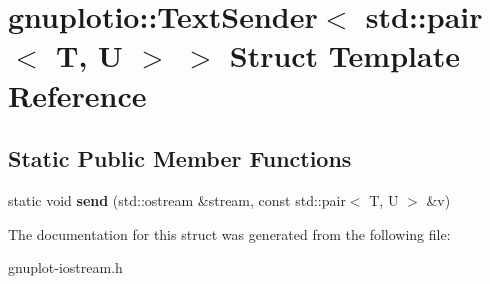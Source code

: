 \hypertarget{structgnuplotio_1_1TextSender_3_01std_1_1pair_3_01T_00_01U_01_4_01_4}{}\section{gnuplotio\+:\+:Text\+Sender$<$ std\+:\+:pair$<$ T, U $>$ $>$ Struct Template Reference}
\label{structgnuplotio_1_1TextSender_3_01std_1_1pair_3_01T_00_01U_01_4_01_4}
\subsection*{Static Public Member Functions}
\begin{DoxyCompactItemize}
\item 
\mbox{\label{structgnuplotio_1_1TextSender_3_01std_1_1pair_3_01T_00_01U_01_4_01_4_ae1f3a6ffd8a60bb73d787578327154d1}} 
static void {\bfseries send} (std\+::ostream \&stream, const std\+::pair$<$ T, U $>$ \&v)
\end{DoxyCompactItemize}


The documentation for this struct was generated from the following file\+:\begin{DoxyCompactItemize}
\item 
gnuplot-\/iostream.\+h\end{DoxyCompactItemize}

